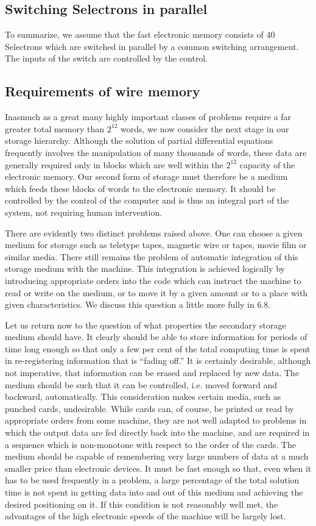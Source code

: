 \documentclass[12pt]{amsart}
\begin{document}
\subsection{Switching Selectrons in parallel}
To summarize, we assume that the fast electronic memory consists of 40 Selectrons which are switched in parallel by a common switching arrangement. The inputs of the switch are controlled by the control.

\subsection{Requirements of wire memory}
Inasmuch as a great many highly important classes of problems require a far greater total memory than $2^{12}$ words, we now consider the next stage in our storage hierarchy. Although the solution of partial differential equations frequently involves the manipulation of many thousands of words, these data are generally required only in blocks which are well within the $2^{12}$ capacity of the electronic memory. Our second form of storage must therefore be a medium which feeds these blocks of words to the electronic memory. It should be controlled by the control of the computer and is thus an integral part of the system, not requiring human intervention.

There are evidently two distinct problems raised above. One can choose a given medium for storage such as teletype tapes, magnetic wire or tapes, movie film or similar media. There still remains the problem of automatic integration of this storage medium with the machine. This integration is achieved logically by introducing appropriate orders into the code which can instruct the machine to read or write on the medium, or to move it by a given amount or to a place with given characteristics. We discuss this question a little more fully in 6.8.

Let us return now to the question of what properties the secondary storage medium should have. It clearly should be able to store information for periods of time long enough so that only a few per cent of the total computing time is spent in re-registering information that is ``fading off.'' It is certainly desirable, although not imperative, that information can be erased and replaced by new data. The medium should be such that it can be controlled, i.e. moved forward and backward, automatically. This consideration makes certain media, such as punched cards, undesirable. While cards can, of course, be printed or read by appropriate orders from some machine, they are not well adapted to problems in which the output data are fed directly back into the machine, and are required in a sequence which is non-monotone with respect to the order of the cards. The medium should be capable of remembering very large numbers of data at a much smaller price than electronic devices. It must be fast enough so that, even when it has to be used frequently in a problem, a large percentage of the total solution time is not spent in getting data into and out of this medium and achieving the desired positioning on it. If this condition is not reasonably well met, the advantages of the high electronic speeds of the machine will be largely lost.
\end{document}
